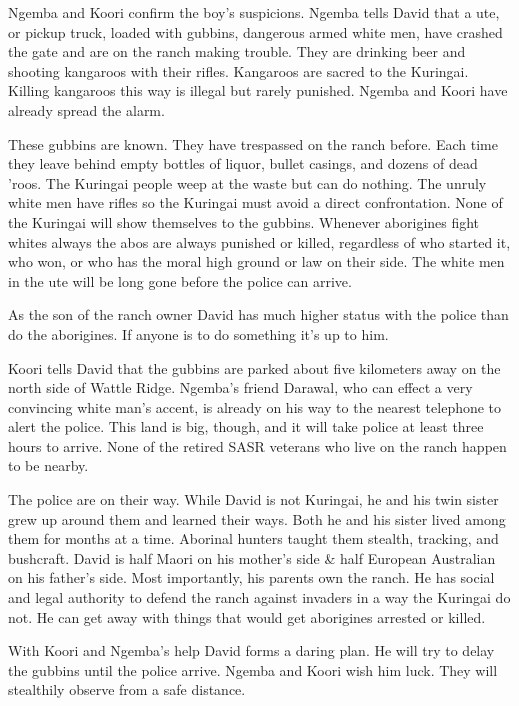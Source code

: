 Ngemba and Koori confirm the boy's suspicions. Ngemba tells David that a ute, or pickup truck, loaded with gubbins, dangerous armed white men, have crashed the gate and are on the ranch making trouble.  They are drinking beer and shooting kangaroos with their rifles. Kangaroos are sacred to the Kuringai.  Killing kangaroos this way is illegal but rarely punished. Ngemba and Koori have already spread the alarm.

These gubbins are known.  They have trespassed on the ranch before.  Each time they leave behind empty bottles of liquor, bullet casings, and dozens of dead 'roos.  The Kuringai people weep at the waste but can do nothing.  The unruly white men have rifles so the Kuringai must avoid a direct confrontation.  None of the Kuringai will show themselves to the gubbins.   Whenever aborigines fight whites always the abos are always punished or killed, regardless of who started it, who won, or who has the moral high ground or law on their side.  The white men in the ute will be long gone before the police can arrive.

As the son of the ranch owner David has much higher status with the police than do the aborigines.  If anyone is to do something it's up to him.

Koori tells David that the gubbins are parked about five kilometers away on the north side of Wattle Ridge. Ngemba's friend Darawal, who can effect a very convincing white man's accent, is already on his way to the nearest telephone to alert the police.  This land is big, though, and it will take police at least three hours to arrive.  None of the retired SASR veterans who live on the ranch happen to be nearby.

The police are on their way.   While David is not Kuringai, he and his twin sister grew up around them and learned their ways. Both he and his sister lived among them for months at a time.  Aborinal hunters taught them stealth, tracking, and bushcraft.  David is half Maori on his mother's side \& half European Australian on his father's side.  Most importantly, his parents own the ranch.  He has social and legal authority to defend the ranch against invaders in a way the Kuringai do not.  He can get away with things that would get aborigines arrested or killed.

With Koori and Ngemba's help David forms a daring plan. He will try to delay the gubbins until the police arrive.  Ngemba and Koori wish him luck.  They will stealthily observe from a safe distance.

